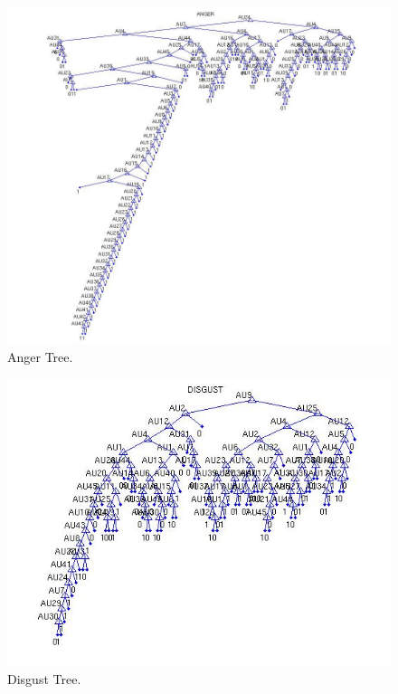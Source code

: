 \documentclass[a4paper,12pt,oneside,final]{report}
\newenvironment{changemargin}[2]{\begin{list}{}{%
\setlength{\topsep}{0pt}%
\setlength{\leftmargin}{0pt}%
\setlength{\rightmargin}{0pt}%
\setlength{\listparindent}{\parindent}%
\setlength{\itemindent}{\parindent}%
\setlength{\parsep}{0pt plus 1pt}%
\addtolength{\leftmargin}{#1}%
\addtolength{\rightmargin}{#2}%
}\item }{\end{list}}
\begin{document}
\begin{figure}[h]
\begin{changemargin}{-20mm}{-20mm}
\begin{center}
\includegraphics[scale=0.6]{anger.jpg}
\end{center}
\caption{Anger Tree.}
\end{changemargin}
\end{figure}

\begin{figure}[!h]
\begin{changemargin}{-20mm}{-20mm}
\center
\includegraphics[scale=0.6]{disgust.jpg}
\caption{Disgust Tree.}
\end{changemargin}
\end{figure}
\end{document}
